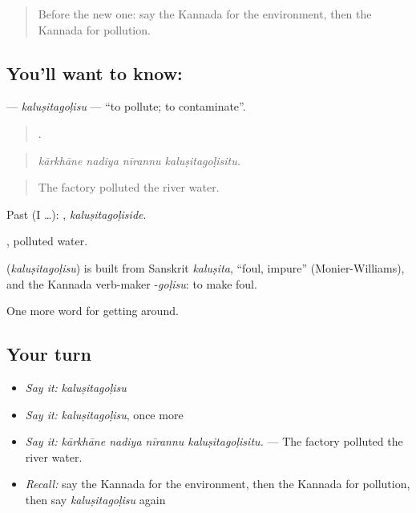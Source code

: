 \label{lesson:KA-C473-kalusitagolisu}



\begin{quote}
Before the new one: say the Kannada for the environment, then the Kannada for pollution.
\end{quote}

\subsection*{You'll want to know: }
\textbf{} — \emph{kaluṣitagoḷisu} — \textquotedblleft{}to pollute; to contaminate\textquotedblright{}.

\begin{quote}
   .
\end{quote}

\begin{quote}
\emph{kārkhāne nadiya nīrannu kaluṣitagoḷisitu.}
\end{quote}

\begin{quote}
The factory polluted the river water.
\end{quote}

Past (I …): , \emph{kaluṣitagoḷiside}.

 , polluted water.

\begin{cousinweb}
\textbf{} (\emph{kaluṣitagoḷisu}) is built from Sanskrit \emph{kaluṣita}, \textquotedblleft{}foul, impure\textquotedblright{} (Monier-Williams), and the Kannada verb-maker -\emph{goḷisu}: to make foul.
\end{cousinweb}

\begin{grammarlens}[title={What you've built}]
One more word for getting around.
\end{grammarlens}

\subsection*{Your turn}
\begin{itemize}
\raggedright
  \item \emph{Say it:} \emph{kaluṣitagoḷisu}
  \item \emph{Say it:} \emph{kaluṣitagoḷisu}, once more
  \item \emph{Say it:} \emph{kārkhāne nadiya nīrannu kaluṣitagoḷisitu.} — The factory polluted the river water.
  \item \emph{Recall:} say the Kannada for the environment, then the Kannada for pollution, then say \emph{kaluṣitagoḷisu} again
\end{itemize}

